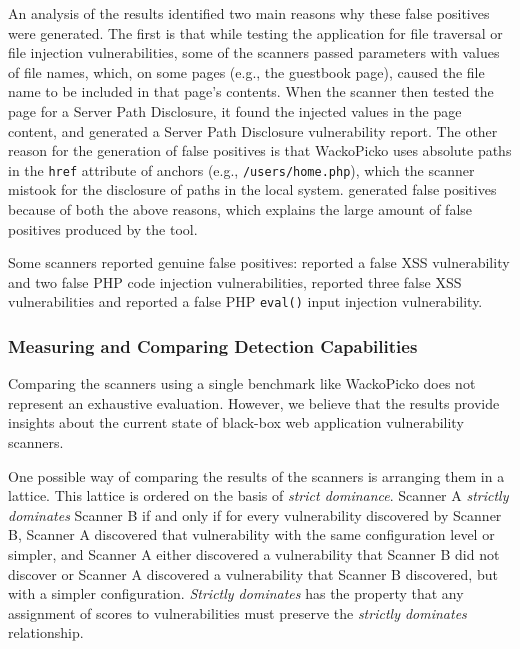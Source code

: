 An analysis of the results identified two main reasons why these
false positives were generated. The first is that while testing the
application for file traversal or file injection vulnerabilities, some of the scanners passed
parameters with values of file names, which, on some pages (e.g., the guestbook page),
caused the file name to be included in that page's contents. When the
scanner then tested the page for a Server Path Disclosure, it found
the injected values in the page content, and generated a Server Path Disclosure
vulnerability report. 
The other reason for the generation of false positives is that WackoPicko uses
absolute paths in the {\tt href} attribute of anchors (e.g.,
{\tt/users/home.php}), which the scanner mistook for the disclosure of paths in
the local system. 
\webinspect{} generated false positives because of both the above reasons, which explains the
large amount of false positives produced by the tool. 

Some scanners reported
genuine false positives: \hailstorm{} reported a false XSS vulnerability and two
false PHP code injection vulnerabilities, \ntospider{} reported three false XSS
vulnerabilities and \waf{} reported a false PHP {\tt eval()} input injection
vulnerability.

\subsubsection{Measuring and Comparing Detection Capabilities}

Comparing the scanners using a single benchmark like WackoPicko does
not represent an exhaustive evaluation. However, we believe that the results
provide insights about the current state of black-box web application
vulnerability scanners.

One possible way of comparing the results of the scanners is arranging them in a
lattice. This lattice is ordered on the basis of \emph{strict
  dominance}. Scanner A \emph{strictly dominates} Scanner B if and only if for
every vulnerability discovered by Scanner B, Scanner A discovered that
vulnerability with the same configuration level or simpler, and Scanner A either
discovered a vulnerability that Scanner B did not discover or Scanner A discovered a
vulnerability that Scanner B discovered, but with a simpler configuration.
\emph{Strictly dominates} has the property that any assignment of scores to
vulnerabilities must preserve the \emph{strictly dominates} relationship.

